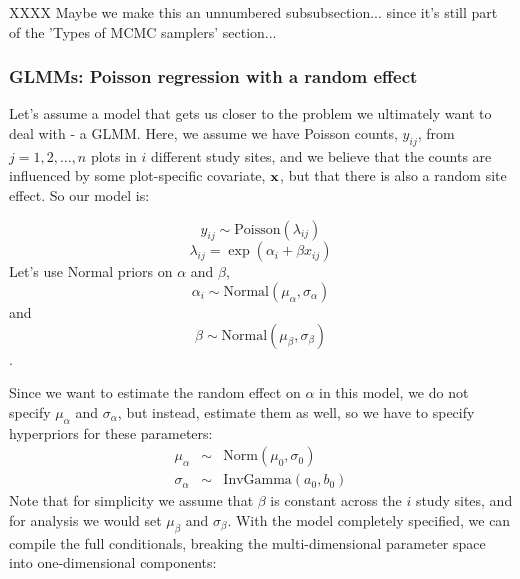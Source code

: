 XXXX Maybe we make this an unnumbered subsubsection... since it's still part of the 'Types of MCMC samplers' section...
\subsubsection*{ GLMMs: Poisson regression with a random effect }

Let's assume a model that gets us closer to the problem we ultimately
want to deal with - a GLMM. Here, we assume we have Poisson counts,
$y_{ij}$, from $j=1,2,\ldots,n$ plots in $i$ different study sites, and we believe that the counts are influenced by some plot-specific covariate, ${\bf x}$, but that there is also a random site effect. So our model is:

  
\[
y_{ij} \sim \mbox{Poisson}(\lambda_{ij})
\]
\[
\lambda_{ij} = \exp (\alpha_i + \beta x_{ij})
\]
Let's use Normal priors on $\alpha$ and $\beta$,  \[
\alpha_i \sim \mbox{Normal} (\mu_{\alpha}, \sigma_{\alpha})
\]
and
\[
\beta \sim \mbox{Normal} (\mu_{\beta}, \sigma_{\beta})
\].

Since we want to estimate the random effect on $\alpha$ in this model, we do not
specify $\mu_{\alpha}$ and $\sigma_{\alpha}$, but instead, estimate them as well, so we have
to specify hyperpriors for these parameters:
\begin{eqnarray*}
\mu_{\alpha}  &\sim &  \mbox{Norm}(\mu_0, \sigma_0)  \\
\sigma_{\alpha} & \sim & \mbox{InvGamma}(a_0, b_0)
\end{eqnarray*}
Note that for simplicity we assume that $\beta$ is constant across the $i$ study sites, and for analysis we would set $\mu_{\beta}$ and $\sigma_{\beta}$.
With the model completely specified, we can compile the full conditionals,
breaking the multi-dimensional parameter space into one-dimensional
components:


